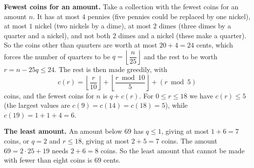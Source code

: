 \textbf{Fewest coins for an amount.} Take a collection with the fewest coins for an amount $n$. It has at most $4$ pennies (five pennies could be replaced by one nickel), at most $1$ nickel (two nickels by a dime), at most $2$ dimes (three dimes by a quarter and a nickel), and not both $2$ dimes and a nickel (these make a quarter). So the coins other than quarters are worth at most $20+4=24$ cents, which forces the number of quarters to be $q=\left\lfloor\dfrac {n}{25}\right\rfloor$ and the rest to be worth $r=n-25q\le24$. The rest is then made greedily, with
\[
c(r)=\left\lfloor\dfrac {r}{10}\right\rfloor+\left\lfloor\dfrac{r\bmod10}{5}\right\rfloor+(r\bmod5)
\]
coins, and the fewest coins for $n$ is $q+c(r)$. For $0\le r\le18$ we have $c(r)\le5$ (the largest values are $c(9)=c(14)=c(18)=5$), while $c(19)=1+1+4=6$.

\textbf{The least amount.} An amount below $69$ has $q\le1$, giving at most $1+6=7$ coins, or $q=2$ and $r\le18$, giving at most $2+5=7$ coins. The amount $69=2\cdot25+19$ needs $2+6=8$ coins. So the least amount that cannot be made with fewer than eight coins is $\boxed{69}$ cents.
